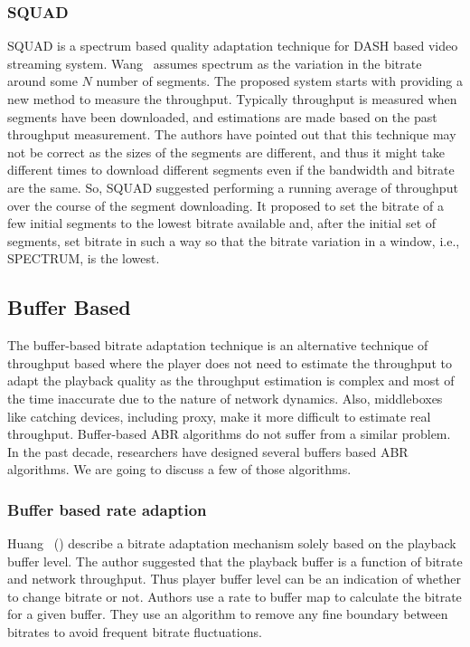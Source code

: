 \subsubsection{SQUAD}
SQUAD\cite{10.1145/2910017.2910593} is a spectrum\cite{1386243} based quality adaptation technique for DASH based video streaming system. Wang \etal\ assumes spectrum as the variation in the bitrate around some $N$ number of segments. The proposed system starts with providing a new method to measure the throughput. Typically throughput is measured when segments have been downloaded, and estimations are made based on the past throughput measurement. The authors have pointed out that this technique may not be correct as the sizes of the segments are different, and thus it might take different times to download different segments even if the bandwidth and bitrate are the same. So, SQUAD suggested performing a running average of throughput over the course of the segment downloading. It proposed to set the bitrate of a few initial segments to the lowest bitrate available and, after the initial set of segments, set bitrate in such a way so that the bitrate variation in a window, i.e., SPECTRUM, is the lowest.


\subsection{Buffer Based}
The buffer-based bitrate adaptation technique is an alternative technique of throughput based where the player does not need to estimate the throughput to adapt the playback quality as the throughput estimation is complex and most of the time inaccurate due to the nature of network dynamics. Also, middleboxes like catching devices, including proxy, make it more difficult to estimate real throughput. Buffer-based ABR algorithms do not suffer from a similar problem. In the past decade, researchers have designed several buffers based ABR algorithms. We are going to discuss a few of those algorithms.

\subsubsection{Buffer based rate adaption}
Huang \etal\ (\cite{Huang2014,10.1145/2398776.2398800,10.1145/2491172.2491179}) describe a bitrate adaptation mechanism solely based on the playback buffer level. The author suggested that the playback buffer is a function of bitrate and network throughput. Thus player buffer level can be an indication of whether to change bitrate or not. Authors use a rate to buffer map to calculate the bitrate for a given buffer. They use an algorithm to remove any fine boundary between bitrates to avoid frequent bitrate fluctuations.

